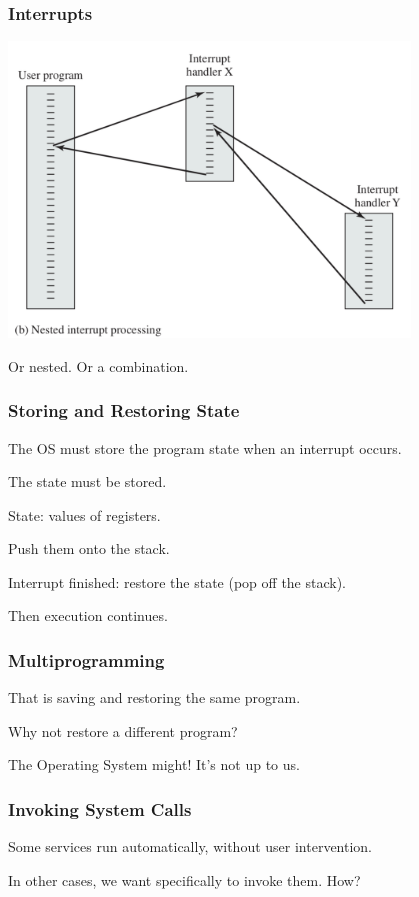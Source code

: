 \begin{frame}
\frametitle{Interrupts}

\begin{center}
\includegraphics[width=0.8\textwidth]{images/interrupts-nest.png}
\end{center}

Or nested. Or a combination.

\end{frame}

\begin{frame}
\frametitle{Storing and Restoring State}

The OS must store the program state when an interrupt occurs.

The state must be stored.

State: values of registers.

Push them onto the stack.

Interrupt finished: restore the state (pop off the stack).

Then execution continues.

\end{frame}

\begin{frame}
\frametitle{Multiprogramming}
That is saving and restoring the same program.

Why not restore a different program?

The Operating System might! It's not up to us.


\end{frame}

\begin{frame}
\frametitle{Invoking System Calls}

Some services run automatically, without user intervention.

In other cases, we want specifically to invoke them. How?

\end{frame}


